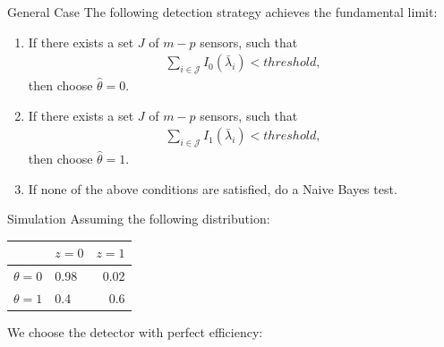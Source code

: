 \documentclass[10pt]{beamer}
\newcommand{\tikzdir}[1]{#1.tikz}
\newcommand{\inputtikz}[1]{}}
\begin{document}
\begin{frame}{General Case}
  The following detection strategy achieves the fundamental limit:
  \begin{enumerate}
  \item If there exists a set $J$ of $m-p$ sensors, such that
    \begin{align*}
      \sum_{i\in \mathcal J}I_0(\bar \lambda_i) < threshold,
    \end{align*}
    then choose $\hat \theta = 0$. 
  \item If there exists a set $J$ of $m-p$ sensors, such that
    \begin{align*}
      \sum_{i\in \mathcal J}I_1(\bar \lambda_i) < threshold,
    \end{align*}
    then choose $\hat \theta = 1$. 
  \item If none of the above conditions are satisfied, do a Naive Bayes test.
  \end{enumerate}
\end{frame}

\begin{frame}{Simulation}
  Assuming the following distribution:
  \begin{center}
    \begin{tabular}{@{}llr@{}}
      \toprule
      & $z = 0$ & $z=1$\\
      \midrule
      $\theta=0$ &0.98&0.02\\
      $\theta=1$ &0.4&0.6\\
      \bottomrule
    \end{tabular}
  \end{center}  
  We choose the detector with perfect efficiency:
  \begin{center}
    \inputtikz{finite_time}
  \end{center}
\end{frame}
\end{document}
